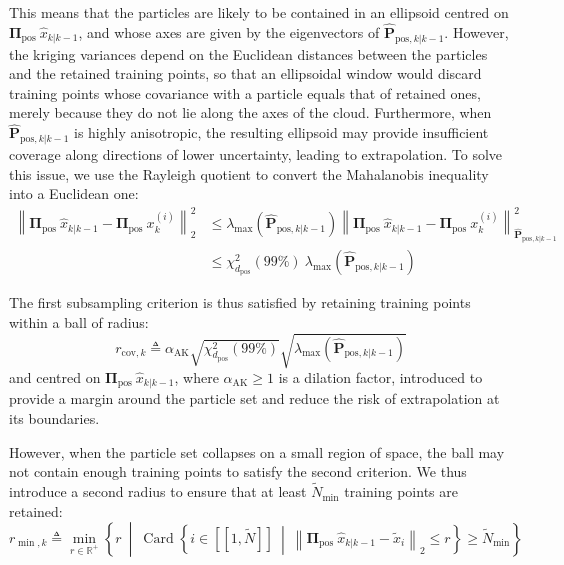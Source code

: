 This means that the particles are likely to be contained in an ellipsoid centred on $\boldsymbol{\Pi}_{\mathrm{pos}}\:\hat{x}_{k|k-1}$, and whose axes are given by the eigenvectors of $\hat{\mathbf{P}}_{\mathrm{pos},k|k-1}$. However, the kriging variances depend on the Euclidean distances between the particles and the retained training points, so that an ellipsoidal window would discard training points whose covariance with a particle equals that of retained ones, merely because they do not lie along the axes of the cloud. Furthermore, when $\hat{\mathbf{P}}_{\mathrm{pos},k|k-1}$ is highly anisotropic, the resulting ellipsoid may provide insufficient coverage along directions of lower uncertainty, leading to extrapolation. To solve this issue, we use the Rayleigh quotient \cite{bib:matrix-hermitian} to convert the Mahalanobis inequality into a Euclidean one:
\begin{equation}
	\begin{aligned}
	\left\|\boldsymbol{\Pi}_{\mathrm{pos}}\:\hat{x}_{k|k-1}-\boldsymbol{\Pi}_{\mathrm{pos}}\:x_k^{(i)}\right\|_2^2&\leq\lambda_{\max}\left(\hat{\mathbf{P}}_{\mathrm{pos},k|k-1}\right)\left\|\boldsymbol{\Pi}_{\mathrm{pos}}\:\hat{x}_{k|k-1}-\boldsymbol{\Pi}_{\mathrm{pos}}\:x_k^{(i)}\right\|_{\hat{\mathbf{P}}_{\mathrm{pos},k|k-1}}^2\\
	&\leq\chi_{d_{\mathrm{pos}}}^2(99\%)\:\lambda_{\max}\left(\hat{\mathbf{P}}_{\mathrm{pos},k|k-1}\right)
	\end{aligned}
\end{equation}

The first subsampling criterion is thus satisfied by retaining training points within a ball of radius:
\begin{equation}
	r_{\mathrm{cov},k}\triangleq\alpha_{\mathrm{AK}}\sqrt{\chi_{d_{\mathrm{pos}}}^2(99\%)}\sqrt{\lambda_{\max}\left(\hat{\mathbf{P}}_{\mathrm{pos},k|k-1}\right)}\label{eq:r_cov}
\end{equation}
and centred on $\boldsymbol{\Pi}_{\mathrm{pos}}\:\hat{x}_{k|k-1}$, where $\alpha_{\mathrm{AK}}\geq1$ is a dilation factor, introduced to provide a margin around the particle set and reduce the risk of extrapolation at its boundaries.

However, when the particle set collapses on a small region of space, the ball may not contain enough training points to satisfy the second criterion. We thus introduce a second radius to ensure that at least $\tilde{N}_{\min}$ training points are retained:
\begin{equation}
	r_{\min,k}\triangleq\underset{r\in\mathbb{R}^+}{\min}\left\{r\:\middle|\:\operatorname{Card}\left\{i\in[\![1,\tilde{N}]\!]\:\middle|\:\left\|\boldsymbol{\Pi}_{\mathrm{pos}}\:\hat{x}_{k|k-1}-\tilde{x}_i\right\|_2\leq r\right\}\geq\tilde{N}_{\min}\right\}\label{eq:r_min}
\end{equation}

